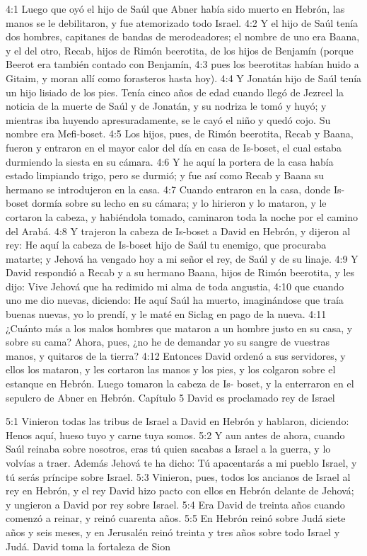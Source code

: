 4:1 Luego que oyó el hijo de Saúl que Abner había sido muerto en Hebrón, las manos se le debilitaron, y fue atemorizado todo Israel.  
4:2 Y el hijo de Saúl tenía dos hombres, capitanes de bandas de merodeadores; el nombre de uno era Baana, y el del otro, Recab, hijos de Rimón beerotita, de los hijos de Benjamín (porque Beerot era también contado con Benjamín,  
4:3 pues los beerotitas habían huido a Gitaim, y moran allí como forasteros hasta hoy).  
4:4 Y Jonatán hijo de Saúl tenía un hijo lisiado de los pies. Tenía cinco años de edad cuando llegó de Jezreel la noticia de la muerte de Saúl y de Jonatán, y su nodriza le tomó y huyó; y mientras iba huyendo apresuradamente, se le cayó el niño y quedó cojo. Su nombre era Mefi-boset.  
4:5 Los hijos, pues, de Rimón beerotita, Recab y Baana, fueron y entraron en el mayor calor del día en casa de Is-boset, el cual estaba durmiendo la siesta en su cámara.  
4:6 Y he aquí la portera de la casa había estado limpiando trigo, pero se durmió; y fue así como Recab y Baana su hermano se introdujeron en la casa.  
4:7 Cuando entraron en la casa, donde Is-boset dormía sobre su lecho en su cámara; y lo hirieron y lo mataron, y le cortaron la cabeza, y habiéndola tomado, caminaron toda la noche por el camino del Arabá.  
4:8 Y trajeron la cabeza de Is-boset a David en Hebrón, y dijeron al rey: He aquí la cabeza de Is-boset hijo de Saúl tu enemigo, que procuraba matarte; y Jehová ha vengado hoy a mi señor el rey, de Saúl y de su linaje.  
4:9 Y David respondió a Recab y a su hermano Baana, hijos de Rimón beerotita, y les dijo: Vive Jehová que ha redimido mi alma de toda angustia,  
4:10 que cuando uno me dio nuevas, diciendo: He aquí Saúl ha muerto, imaginándose que traía buenas nuevas, yo lo prendí, y le maté en Siclag en pago de la nueva. 
4:11 ¿Cuánto más a los malos hombres que mataron a un hombre justo en su casa, y sobre su cama? Ahora, pues, ¿no he de demandar yo su sangre de vuestras manos, y quitaros de la tierra? 
4:12 Entonces David ordenó a sus servidores, y ellos los mataron, y les cortaron las manos y los pies, y los colgaron sobre el estanque en Hebrón. Luego tomaron la cabeza de Is- boset, y la enterraron en el sepulcro de Abner en Hebrón.  
Capítulo 5
David es proclamado rey de Israel  
 

5:1 Vinieron todas las tribus de Israel a David en Hebrón y hablaron, diciendo: Henos aquí, hueso tuyo y carne tuya somos.  
5:2 Y aun antes de ahora, cuando Saúl reinaba sobre nosotros, eras tú quien sacabas a Israel a la guerra, y lo volvías a traer. Además Jehová te ha dicho: Tú apacentarás a mi pueblo Israel, y tú serás príncipe sobre Israel.  
5:3 Vinieron, pues, todos los ancianos de Israel al rey en Hebrón, y el rey David hizo pacto con ellos en Hebrón delante de Jehová; y ungieron a David por rey sobre Israel.  
5:4 Era David de treinta años cuando comenzó a reinar, y reinó cuarenta años.  
5:5 En Hebrón reinó sobre Judá siete años y seis meses, y en Jerusalén reinó treinta y tres años sobre todo Israel y Judá. 
David toma la fortaleza de Sion  
 
